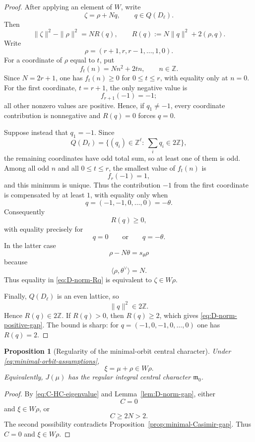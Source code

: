 \documentclass[11pt]{amsart}
\newtheorem{proposition}[theorem]{Proposition}
\theoremstyle{remark}
\numberwithin{equation}{section}
\begin{document}
\begin{proof}
After applying an element of \(W\), write
\[
   \zeta=\rho+Nq,
   \qquad
   q\in Q(D_\ell).
\]
Then
\begin{equation}
\label{eq:D-norm-Rq}
   \|\zeta\|^2-\|\rho\|^2
   =
   N R(q),
   \qquad
   R(q):=
   N\|q\|^2+2(\rho,q).
\end{equation}
Write
\[
   \rho=(r+1,r,r-1,\ldots,1,0).
\]
For a coordinate of \(\rho\) equal to \(t\), put
\[
   f_t(n)=Nn^2+2tn,
   \qquad n\in\mathbb Z.
\]
Since \(N=2r+1\), one has \(f_t(n)\ge0\) for
\(0\le t\le r\), with equality only at \(n=0\).  For the first
coordinate, \(t=r+1\), the only negative value is
\[
   f_{r+1}(-1)=-1;
\]
all other nonzero values are positive.  Hence, if \(q_1\ne-1\), every
coordinate contribution is nonnegative and \(R(q)=0\) forces \(q=0\).

Suppose instead that \(q_1=-1\).  Since
\[
   Q(D_\ell)=\{(q_i)\in\mathbb Z^\ell:\ \sum_iq_i\in2\mathbb Z\},
\]
the remaining coordinates have odd total sum, so at least one of them is
odd.  Among all odd \(n\) and all \(0\le t\le r\), the smallest value of
\(f_t(n)\) is
\[
   f_r(-1)=1,
\]
and this minimum is unique.  Thus the contribution \(-1\) from the first
coordinate is compensated by at least \(1\), with equality only when
\[
   q=(-1,-1,0,\ldots,0)=-\theta.
\]
Consequently
\[
   R(q)\ge0,
\]
with equality precisely for
\[
   q=0
   \qquad\text{or}\qquad
   q=-\theta.
\]
In the latter case
\[
   \rho-N\theta=s_\theta\rho
\]
because
\[
   \langle\rho,\theta^\vee\rangle=N.
\]
Thus equality in \eqref{eq:D-norm-Rq} is equivalent to
\(\zeta\in W\rho\).

Finally, \(Q(D_\ell)\) is an even lattice, so
\[
   \|q\|^2\in2\mathbb Z.
\]
Hence \(R(q)\in2\mathbb Z\).  If \(R(q)>0\), then \(R(q)\ge2\), which gives
\eqref{eq:D-norm-positive-gap}.  The bound is sharp: for
\(q=(-1,0,-1,0,\ldots,0)\) one has \(R(q)=2\).
\end{proof}

\begin{proposition}[Regularity of the minimal-orbit central character]
\label{prop:minimal-regular-central-character}
Under \eqref{eq:minimal-orbit-assumptions},
\[
   \xi=\mu+\rho\in W\rho.
\]
Equivalently, \(J(\mu)\) has the regular integral central character
\(\mathfrak m_0\).
\end{proposition}

\begin{proof}
By \eqref{eq:C-HC-eigenvalue} and Lemma~\ref{lem:D-norm-gap},
either
\[
   C=0
\]
and \(\xi\in W\rho\), or
\[
   C\ge2N>2.
\]
The second possibility contradicts
Proposition~\ref{prop:minimal-Casimir-gap}.  Thus \(C=0\) and
\(\xi\in W\rho\).
\end{proof}
\end{document}
